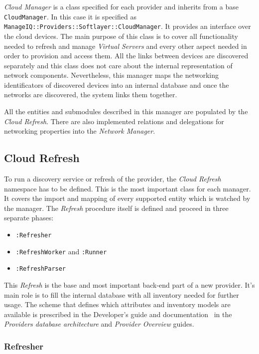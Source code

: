 \emph{Cloud Manager} is a class specified for each provider and inherits from a base \verb|CloudManager|. In this case it is specified as \verb|ManageIQ::Providers::Softlayer::CloudManager|. It provides an interface over the cloud devices. The main purpose of this class is to cover all functionality needed to refresh and manage \emph{Virtual Servers} and every other aspect needed in order to provision and access them. All the links between devices are discovered separately and this class does not care about the internal representation of network components. Nevertheless, this manager maps the networking identificators of discovered devices into an internal database and once the networks are discovered, the system links them together.

All the entities and submodules described in this manager are populated by the \emph{Cloud Refresh}. There are also implemented relations and delegations for networking properties into the \emph{Network Manager}.

\clearpage
\subsection{Cloud Refresh}
\label{sub:Cloud Refresh}

To run a discovery service or refresh of the provider, the \emph{Cloud Refresh} namespace has to be defined. This is the most important class for each manager. It covers the import and mapping of every supported entity which is watched by the manager. The \emph{Refresh} procedure itself is defined and proceed in three separate phases:

\begin{itemize}
	\item \verb|:Refresher|
	\item \verb|:RefreshWorker| and \verb|:Runner|
	\item \verb|:RefreshParser|
\end{itemize}

This \emph{Refresh} is the base and most important back-end part of a new provider. It's main role is to fill the internal database with all inventory needed for further usage. The scheme that defines which attributes and inventory models are available is prescribed in the Developer's guide and documentation~\cite{manageiq_dev} in the \emph{Providers database architecture} and \emph{Provider Overview} guides.

\subsubsection{Refresher}
\label{subs:Refresher}


